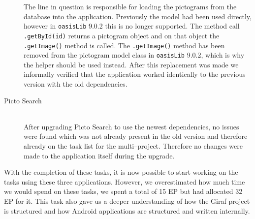 \begin{description}
    The line in question is responsible for loading the pictograms from the database into the application.
    Previously the model had been used directly, however in \texttt{oasisLib} 9.0.2 this is no longer supported.
    The method call \texttt{.getById(id)} returns a pictogram object and on that object the \texttt{.getImage()} method is called.
    The \texttt{.getImage()} method has been removed from the pictogram model class in \texttt{oasisLib} 9.0.2, which is why the helper should be used instead.
    After this replacement was made we informally verified that the application worked identically to the previous version with the old dependencies.

    \item[Picto Search] \hfill \\
    After upgrading Picto Search to use the newest dependencies, no issues were found which was not already present in the old version and therefore already on the task list for the multi--project.
    Therefore no changes were made to the application itself during the upgrade.
\end{description}

 With the completion of these tasks, it is now possible to start working on the tasks using these three applications.
 However, we overestimated how much time we would spend on these tasks, we spent a total of 15 EP but had allocated 32 EP for it.
 This task also gave us a deeper understanding of how the Giraf project is structured and how Android applications are structured and written internally.
